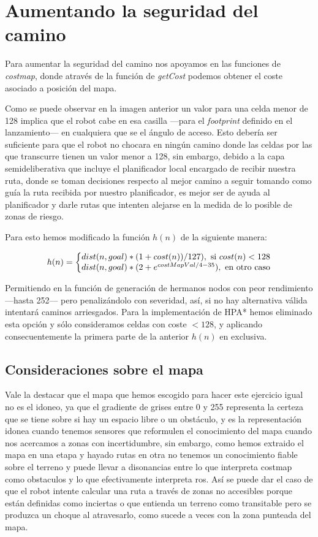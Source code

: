 \documentclass{article}
\newcommand{\img}[1]{
\noindent\makebox[\textwidth][c]{\texttt{[image: \#1]}}%
}
\begin{document}
\section{Aumentando la seguridad del camino}

Para aumentar la seguridad del camino nos apoyamos en las funciones de \emph{costmap}, donde através de la función de \emph{getCost} podemos obtener el coste asociado a posición del mapa.

\img{costmap}

Como se puede observar en la imagen anterior un valor para una celda menor de 128 implica que el robot cabe en esa casilla ---para el \emph{footprint} definido en el lanzamiento--- en cualquiera que se el ángulo de acceso. Esto debería ser suficiente para que el robot no chocara en ningún camino donde las celdas por las que transcurre tienen un valor menor a 128, sin embargo, debido a la capa semideliberativa que incluye el planificador local encargado de recibir nuestra ruta, donde se toman decisiones respecto al mejor camino a seguir tomando como guía la ruta recibida por nuestro planificador, es mejor ser de ayuda al planificador y darle rutas que intenten alejarse en la medida de lo posible de zonas de riesgo.

Para esto hemos modificado la función $h(n)$ de la siguiente manera:

\[ h(n) = \left\{\begin{matrix}
dist(n,goal)*(1 + cost(n))/127), \textup{ si }cost(n) < 128
\\ 
dist(n,goal)*(2 + e^{costMapVal/4-35}), \textup{ en otro caso}
\end{matrix}\right. \]

Permitiendo en la función de generación de hermanos nodos con peor rendimiento ---hasta 252--- pero penalizándolo con severidad, así, si no hay alternativa válida intentará caminos arriesgados. Para la implementación de HPA* hemos eliminado esta opción y sólo consideramos celdas con coste $ < 128 $, y aplicando consecuentemente la primera parte de la anterior $h(n)$ en exclusiva.

\subsection{Consideraciones sobre el mapa}

Vale la destacar que el mapa que hemos escogido para hacer este ejercicio igual no es el idoneo, ya que el gradiente de grises entre 0 y 255 representa la certeza que se tiene sobre si hay un espacio libre o un obstáculo, y es la representación idonea cuando tenemos sensores que reformulen el conocimiento del mapa cuando nos acercamos a zonas con incertidumbre, sin embargo, como hemos extraido el mapa en una etapa y hayado rutas en otra no tenemos un conocimiento fiable sobre el terreno y puede llevar a disonancias entre lo que interpreta costmap como obstaculos  y lo que efectivamente interpreta ros. Así se puede dar el caso de que el robot intente calcular una ruta a través de zonas no accesibles porque están definidas como inciertas o que entienda un terreno como transitable pero se produzca un choque al atravesarlo, como sucede a veces con la zona punteada del mapa.
\end{document}
